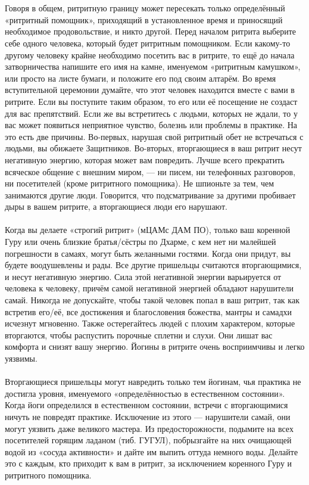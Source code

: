 \\ \\ Говоря в общем, ритритную границу может пересекать только определённый «ритритный помощник», приходящий в установленное время и приносящий необходимое продовольствие, и никто другой. Перед началом ритрита выберите себе одного человека, который будет ритритным помощником. Если какому-то другому человеку крайне необходимо посетить вас в ритрите, то ещё до начала затворничества напишите его имя на камне, именуемом «ритритным камушком», или просто на листе бумаги, и положите его под своим алтарём. Во время вступительной церемонии думайте, что этот человек находится вместе с вами в ритрите. Если вы поступите таким образом, то его или её посещение не создаст для вас препятствий. Если же вы встретитесь с людьми, которых не ждали, то у вас может появиться неприятное чувство, болезнь или проблемы в практике. На это есть две причины. Во-первых, нарушая свой ритритный обет не встречаться с людьми, вы обижаете Защитников. Во-вторых, вторгающиеся в ваш ритрит несут негативную энергию, которая может вам повредить. Лучше всего прекратить всяческое общение с внешним миром, — ни писем, ни телефонных разговоров, ни посетителей (кроме ритритного помощника). Не шпионьте за тем, чем занимаются другие люди. Говорится, что подсматривание за другими пробивает дыры в вашем ритрите, а вторгающиеся люди его нарушают.
\\ \\ Когда вы делаете «строгий ритрит» (мЦАМс ДАМ ПО), только ваш коренной Гуру или очень близкие братья/сёстры по Дхарме, с кем нет ни малейшей погрешности в самаях, могут быть желанными гостями. Когда они придут, вы будете воодушевлены и рады. Все другие пришельцы считаются вторгающимися, и несут негативную энергию. Сила этой негативной энергии варьируется от человека к человеку, причём самой негативной энергией обладают нарушители самай. Никогда не допускайте, чтобы такой человек попал в ваш ритрит, так как встретив его/её, все достижения и благословения божества, мантры и самадхи исчезнут мгновенно. Также остерегайтесь людей с плохим характером, которые вторгаются, чтобы распустить порочные сплетни и слухи. Они лишат вас комфорта и снизят вашу энергию. Йогины в ритрите очень восприимчивы и легко уязвимы.
\\ \\ Вторгающиеся пришельцы могут навредить только тем йогинам, чья практика не достигла уровня, именуемого «определённостью в естественном состоянии». Когда йоги определился в естественном состоянии, встречи с вторгающимися ничуть не повредят практике. Исключение из этого — нарушители самай, они могут уязвить даже великого мастера. Из предосторожности, подымите на всех посетителей горящим ладаном (тиб. ГУГУЛ), побрызгайте на них очищающей водой из «сосуда активности» и дайте им выпить оттуда немного воды. Делайте это с каждым, кто приходит к вам в ритрит, за исключением коренного Гуру и ритритного помощника.
